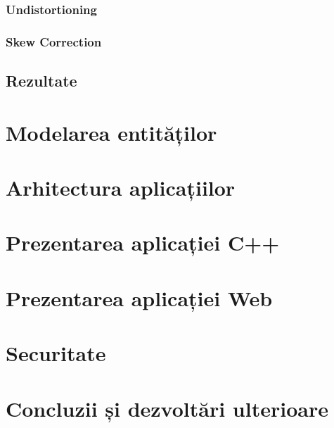 \documentclass[12pt]{article}
\begin{document}
\subsubsection{Undistortioning}
\subsubsection{Skew Correction}

\subsection{Rezultate}

\section{Modelarea entităților}

\section{Arhitectura aplicațiilor}

\section{Prezentarea aplicației C++}

\section{Prezentarea aplicației Web}

\section{Securitate}

\section{Concluzii și dezvoltări ulterioare}
\end{document}
